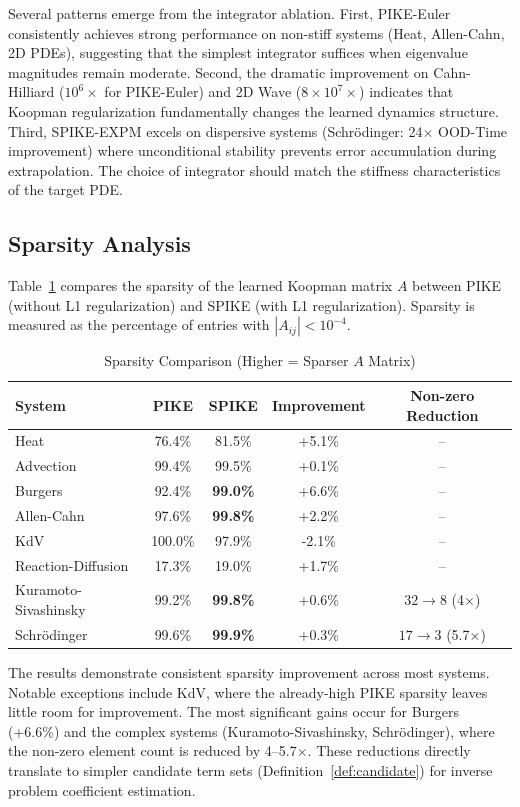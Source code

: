 \documentclass{article}
\theoremstyle{remark}
\begin{document}
Several patterns emerge from the integrator ablation. First, PIKE-Euler consistently achieves strong performance on non-stiff systems (Heat, Allen-Cahn, 2D PDEs), suggesting that the simplest integrator suffices when eigenvalue magnitudes remain moderate. Second, the dramatic improvement on Cahn-Hilliard ($10^6\times$ for PIKE-Euler) and 2D Wave ($8\times 10^7\times$) indicates that Koopman regularization fundamentally changes the learned dynamics structure. Third, SPIKE-EXPM excels on dispersive systems (Schr\"odinger: 24$\times$ OOD-Time improvement) where unconditional stability prevents error accumulation during extrapolation. The choice of integrator should match the stiffness characteristics of the target PDE.

\subsection{Sparsity Analysis}

Table~\ref{tab:sparsity} compares the sparsity of the learned Koopman matrix $A$ between PIKE (without L1 regularization) and SPIKE (with L1 regularization). Sparsity is measured as the percentage of entries with $|A_{ij}| < 10^{-4}$.

\begin{table}[H]
\centering
\caption{Sparsity Comparison (Higher = Sparser $A$ Matrix)}
\label{tab:sparsity}
\begin{tabular}{lcccc}
\toprule
System & PIKE & SPIKE & Improvement & Non-zero Reduction \\
\midrule
Heat & 76.4\% & 81.5\% & +5.1\% & -- \\
Advection & 99.4\% & 99.5\% & +0.1\% & -- \\
Burgers & 92.4\% & \textbf{99.0\%} & +6.6\% & -- \\
Allen-Cahn & 97.6\% & \textbf{99.8\%} & +2.2\% & -- \\
KdV & 100.0\% & 97.9\% & -2.1\% & -- \\
Reaction-Diffusion & 17.3\% & 19.0\% & +1.7\% & -- \\
Kuramoto-Sivashinsky & 99.2\% & \textbf{99.8\%} & +0.6\% & $32 \rightarrow 8$ (4$\times$) \\
Schr\"odinger & 99.6\% & \textbf{99.9\%} & +0.3\% & $17 \rightarrow 3$ (5.7$\times$) \\
\bottomrule
\end{tabular}
\end{table}

The results demonstrate consistent sparsity improvement across most systems. Notable exceptions include KdV, where the already-high PIKE sparsity leaves little room for improvement. The most significant gains occur for Burgers (+6.6\%) and the complex systems (Kuramoto-Sivashinsky, Schr\"odinger), where the non-zero element count is reduced by 4--5.7$\times$. These reductions directly translate to simpler candidate term sets (Definition~\ref{def:candidate}) for inverse problem coefficient estimation.
\end{document}
